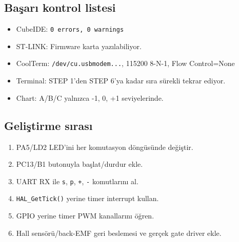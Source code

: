 \documentclass[11pt,a4paper]{article}
\begin{document}
\subsection{Başarı kontrol listesi}
\begin{itemize}
  \item CubeIDE: \texttt{0 errors, 0 warnings}
  \item ST-LINK: Firmware karta yazılabiliyor.
  \item CoolTerm: \texttt{/dev/cu.usbmodem...}, 115200 8-N-1, Flow Control=None
  \item Terminal: STEP 1'den STEP 6'ya kadar sıra sürekli tekrar ediyor.
  \item Chart: A/B/C yalnızca -1, 0, +1 seviyelerinde.
\end{itemize}

\subsection{Geliştirme sırası}
\begin{enumerate}
  \item PA5/LD2 LED'ini her komutasyon döngüsünde değiştir.
  \item PC13/B1 butonuyla başlat/durdur ekle.
  \item UART RX ile \texttt{s}, \texttt{p}, \texttt{+}, \texttt{-} komutlarını al.
  \item \texttt{HAL\_GetTick()} yerine timer interrupt kullan.
  \item GPIO yerine timer PWM kanallarını öğren.
  \item Hall sensörü/back-EMF geri beslemesi ve gerçek gate driver ekle.
\end{enumerate}

\begin{center}
\end{center}
\end{document}
